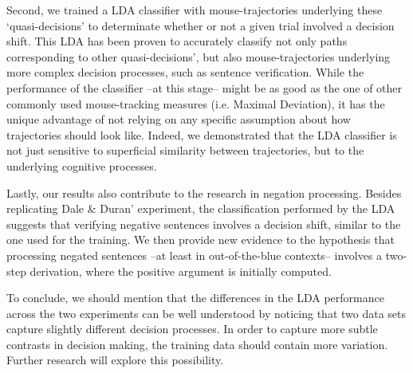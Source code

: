 \documentclass{article}
\begin{document}
Second, we trained a LDA classifier with mouse-trajectories underlying these `quasi-decisions' to determinate whether or not a given trial involved a decision shift. 
This LDA has been proven to accurately classify not only paths corresponding to other quasi-decisions', but also mouse-trajectories underlying more complex decision processes, such as sentence verification. While the performance of the classifier --at this stage-- might be as good as the one of other commonly used mouse-tracking measures (i.e. Maximal Deviation), it has the unique advantage of not relying on any specific assumption about how trajectories should look like. Indeed, we demonstrated that the LDA classifier is not just sensitive to superficial similarity between trajectories, but to the underlying cognitive processes. 

Lastly, our results also contribute to the research in negation processing. Besides replicating Dale \& Duran' experiment, the classification performed by the LDA suggests that verifying negative sentences involves a decision shift, similar to the one used for the training. We then provide new evidence to the hypothesis that processing negated sentences --at least in out-of-the-blue contexts-- involves a two-step derivation, where the positive argument is initially computed.  

%

To conclude, we should mention that the differences in the LDA performance across the two experiments can be well understood by noticing that two data sets capture slightly different decision processes. In order to capture more subtle contrasts in decision making, the training data should contain more variation. Further research will explore this possibility. 
    




\end{document}
